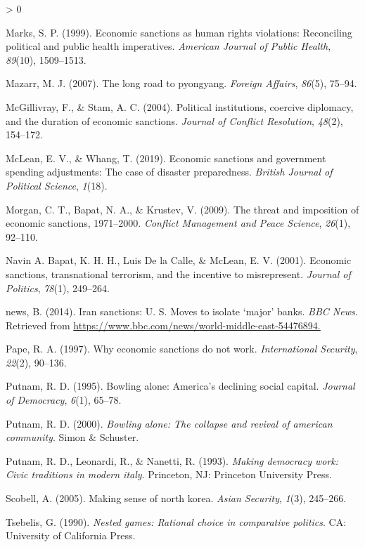 \documentclass[
  english,
  man]{apa6}
\newlength{\cslhangindent}
\newenvironment{CSLReferences}[2] %
 {%
  \setlength{\parindent}{0pt}
  \ifodd #1 \everypar{\setlength{\hangindent}{\cslhangindent}}\ignorespaces\fi
  \ifnum #2 > 0
  \setlength{\parskip}{#2\baselineskip}
  \fi
 }%
 {}
\begin{document}
\begin{CSLReferences}{1}{0}
\leavevmode\hypertarget{ref-marks1999a}{}%
Marks, S. P. (1999). Economic sanctions as human rights violations: Reconciling political and public health imperatives. \emph{American Journal of Public Health}, \emph{89}(10), 1509--1513.

\leavevmode\hypertarget{ref-mazarr2007a}{}%
Mazarr, M. J. (2007). The long road to pyongyang. \emph{Foreign Affairs}, \emph{86}(5), 75--94.

\leavevmode\hypertarget{ref-mcgillivray2004a}{}%
McGillivray, F., \& Stam, A. C. (2004). Political institutions, coercive diplomacy, and the duration of economic sanctions. \emph{Journal of Conflict Resolution}, \emph{48}(2), 154--172.

\leavevmode\hypertarget{ref-mclean2019a}{}%
McLean, E. V., \& Whang, T. (2019). Economic sanctions and government spending adjustments: The case of disaster preparedness. \emph{British Journal of Political Science}, \emph{1}(18).

\leavevmode\hypertarget{ref-morgan2009a}{}%
Morgan, C. T., Bapat, N. A., \& Krustev, V. (2009). The threat and imposition of economic sanctions, 1971--2000. \emph{Conflict Management and Peace Science}, \emph{26}(1), 92--110.

\leavevmode\hypertarget{ref-navin2016a}{}%
Navin A. Bapat, K. H. H., Luis De la Calle, \& McLean, E. V. (2001). Economic sanctions, transnational terrorism, and the incentive to misrepresent. \emph{Journal of Politics}, \emph{78}(1), 249--264.

\leavevmode\hypertarget{ref-bbc2014}{}%
news, B. (2014). Iran sanctions: U. S. Moves to isolate {`major'} banks. \emph{BBC News}. Retrieved from \url{https://www.bbc.com/news/world-middle-east-54476894.}

\leavevmode\hypertarget{ref-pape1997a}{}%
Pape, R. A. (1997). Why economic sanctions do not work. \emph{International Security}, \emph{22}(2), 90--136.

\leavevmode\hypertarget{ref-putnam1995a}{}%
Putnam, R. D. (1995). Bowling alone: America's declining social capital. \emph{Journal of Democracy}, \emph{6}(1), 65--78.

\leavevmode\hypertarget{ref-putnam2000a}{}%
Putnam, R. D. (2000). \emph{Bowling alone: The collapse and revival of american community}. Simon \& Schuster.

\leavevmode\hypertarget{ref-putnam1993a}{}%
Putnam, R. D., Leonardi, R., \& Nanetti, R. (1993). \emph{Making democracy work: Civic traditions in modern italy}. Princeton, NJ: Princeton University Press.

\leavevmode\hypertarget{ref-scobell2005a}{}%
Scobell, A. (2005). Making sense of north korea. \emph{Asian Security}, \emph{1}(3), 245--266.

\leavevmode\hypertarget{ref-tsebelis1990a}{}%
Tsebelis, G. (1990). \emph{Nested games: Rational choice in comparative politics}. CA: University of California Press.

\end{CSLReferences}

\endgroup
\end{document}
